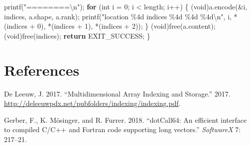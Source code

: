 \documentclass[
  12pt,
]{article}
\newenvironment{Shaded}{\begin{snugshade}}{\end{snugshade}}
\newcommand{\ControlFlowTok}[1]{\textcolor[rgb]{0.13,0.29,0.53}{\textbf{#1}}}
\newcommand{\DataTypeTok}[1]{\textcolor[rgb]{0.13,0.29,0.53}{#1}}
\newcommand{\DecValTok}[1]{\textcolor[rgb]{0.00,0.00,0.81}{#1}}
\newcommand{\NormalTok}[1]{#1}
\newcommand{\SpecialCharTok}[1]{\textcolor[rgb]{0.00,0.00,0.00}{#1}}
\newcommand{\StringTok}[1]{\textcolor[rgb]{0.31,0.60,0.02}{#1}}
\newlength{\cslhangindent}
\newenvironment{cslreferences}%
  {\setlength{\parindent}{0pt}%
  \everypar{\setlength{\hangindent}{\cslhangindent}}\ignorespaces}%
  {\par}
\begin{document}
\begin{Shaded}
\begin{Highlighting}[]
\NormalTok{  printf(}\StringTok{"========}\SpecialCharTok{\textbackslash{}n}\StringTok{"}\NormalTok{);}
  \ControlFlowTok{for}\NormalTok{ (}\DataTypeTok{int}\NormalTok{ i = }\DecValTok{0}\NormalTok{; i \textless{} length; i++) \{}
\NormalTok{    (}\DataTypeTok{void}\NormalTok{)a.encode(\&i, indices, a.shape, a.rank);}
\NormalTok{    printf(}\StringTok{"location \%4d indices \%4d \%4d \%4d}\SpecialCharTok{\textbackslash{}n}\StringTok{"}\NormalTok{, i, *(indices + }\DecValTok{0}\NormalTok{),}
\NormalTok{           *(indices + }\DecValTok{1}\NormalTok{), *(indices + }\DecValTok{2}\NormalTok{));}
\NormalTok{  \}}
\NormalTok{  (}\DataTypeTok{void}\NormalTok{)free(a.content);}
\NormalTok{  (}\DataTypeTok{void}\NormalTok{)free(indices);}
  \ControlFlowTok{return}\NormalTok{ EXIT\_SUCCESS;}
\NormalTok{\}}
\end{Highlighting}
\end{Shaded}

\hypertarget{references}{%
\section*{References}\label{references}}

\hypertarget{refs}{}
\begin{cslreferences}
\leavevmode\hypertarget{ref-deleeuw_E_17s}{}%
De Leeuw, J. 2017. ``Multidimensional Array Indexing and Storage.''
2017. \url{http://deleeuwpdx.net/pubfolders/indexing/indexing.pdf}.

\leavevmode\hypertarget{ref-gerber_moesinger_furrer_18}{}%
Gerber, F., K. Mösinger, and R. Furrer. 2018. ``dotCall64: An efficient
interface to compiled C/C++ and Fortran code supporting long vectors.''
\emph{SoftwareX} 7: 217--21.
\end{cslreferences}
\end{document}
